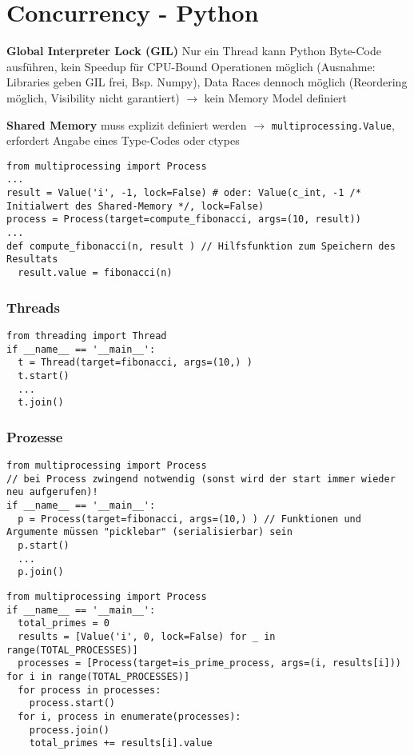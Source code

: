 \section{Concurrency - Python}

\textbf{Global Interpreter Lock (GIL)} Nur ein Thread kann Python Byte-Code ausführen, kein Speedup für CPU-Bound Operationen möglich (Ausnahme: Libraries geben GIL frei, Bsp. Numpy), Data Races dennoch möglich (Reordering möglich, Visibility nicht garantiert) $\rightarrow$ kein Memory Model definiert

\textbf{Shared Memory} muss explizit definiert werden $\rightarrow$ \lstinline{multiprocessing.Value}, erfordert Angabe eines Type-Codes oder ctypes

\begin{lstlisting}
from multiprocessing import Process
...
result = Value('i', -1, lock=False) # oder: Value(c_int, -1 /* Initialwert des Shared-Memory */, lock=False)
process = Process(target=compute_fibonacci, args=(10, result))
...
def compute_fibonacci(n, result ) // Hilfsfunktion zum Speichern des Resultats
  result.value = fibonacci(n)
\end{lstlisting}


\subsubsection{Threads}

\begin{lstlisting}
from threading import Thread
if __name__ == '__main__':
  t = Thread(target=fibonacci, args=(10,) )
  t.start()
  ...
  t.join()
\end{lstlisting}

\subsubsection{Prozesse}

\begin{minipage}[t]{0.5\linewidth}
    \begin{lstlisting}
from multiprocessing import Process
// bei Process zwingend notwendig (sonst wird der start immer wieder neu aufgerufen)!
if __name__ == '__main__':
  p = Process(target=fibonacci, args=(10,) ) // Funktionen und Argumente müssen "picklebar" (serialisierbar) sein
  p.start()
  ...
  p.join()
    \end{lstlisting}
\end{minipage}
\begin{minipage}[t]{0.48\linewidth}
    \begin{lstlisting}
from multiprocessing import Process
if __name__ == '__main__':
  total_primes = 0
  results = [Value('i', 0, lock=False) for _ in range(TOTAL_PROCESSES)]
  processes = [Process(target=is_prime_process, args=(i, results[i])) for i in range(TOTAL_PROCESSES)]
  for process in processes:
    process.start()
  for i, process in enumerate(processes):
    process.join()
    total_primes += results[i].value
    \end{lstlisting}
\end{minipage}


